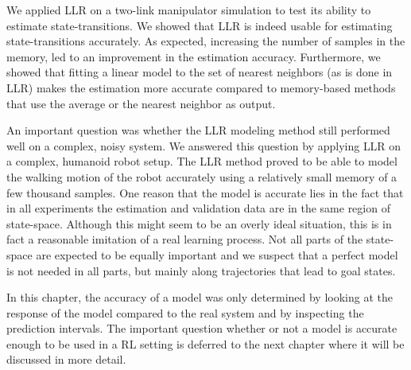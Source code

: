 We applied \ac{LLR} on a two-link manipulator simulation to test its ability to estimate state-transitions. We showed that \ac{LLR} is indeed usable for estimating state-transitions accurately. As expected, increasing the number of samples in the memory, led to an improvement in the estimation accuracy. Furthermore, we showed that fitting a linear model to the set of nearest neighbors (as is done in \ac{LLR}) makes the estimation more accurate compared to memory-based methods that use the average or the nearest neighbor as output.

An important question was whether the \ac{LLR} modeling method still performed well on a complex, noisy system. We answered this question by applying \ac{LLR} on a complex, humanoid robot setup. The \ac{LLR} method proved to be able to model the walking motion of the robot accurately using a relatively small memory of a few thousand samples. One reason that the model is accurate lies in the fact that in all experiments the estimation and validation data are in the same region of state-space. Although this might seem to be an overly ideal situation, this is in fact a reasonable imitation of a real learning process. Not all parts of the state-space are expected to be equally important and we suspect that a perfect model is not needed in all parts, but mainly along trajectories that lead to goal states.

In this chapter, the accuracy of a model was only determined by looking at the response of the model compared to the real system and by inspecting the prediction intervals. The important question whether or not a model is accurate enough to be used in a \ac{RL} setting is deferred to the next chapter where it will be discussed in more detail. 


